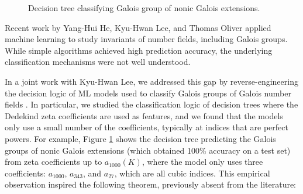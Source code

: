 \documentclass[letterpaper, 10pt]{article}
\begin{document}
\begin{figure} %
    \centering
    \footnotesize
    \caption{Decision tree classifying Galois group of nonic Galois extensions.}
    \label{fig:nonic_zeta_dt}
\end{figure}

Recent work by Yang-Hui He, Kyu-Hwan Lee, and Thomas Oliver applied machine learning to study invariants of number fields, including Galois groups.
While simple algorithms achieved high prediction accuracy, the underlying classification mechanisms were not well understood.

In a joint work with Kyu-Hwan Lee, we addressed this gap by reverse-engineering the decision logic of ML models used to classify Galois groups of Galois number fields \cite{lee2025machines}.
In particular, we studied the classification logic of decision trees where the Dedekind zeta coefficients are used as features, and we found that the models only use a small number of the coefficients, typically at indices that are perfect powers.
For example, Figure \ref{fig:nonic_zeta_dt} shows the decision tree predicting the Galois groups of nonic Galois extensions (which obtained 100\% accuracy on a test set) from zeta coefficients up to $a_{1000}(K)$, where the model only uses three coefficients: $a_{1000}$, $a_{343}$, and $a_{27}$, which are all cubic indices.
This empirical observation inspired the following theorem, previously absent from the literature:
\end{document}
